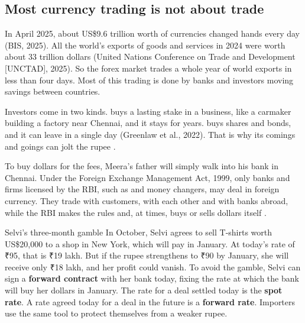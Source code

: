 \subsection{Most currency trading is not about trade}
In April 2025, about US\$9.6 trillion worth of currencies changed hands every day (BIS, 2025). All the world's exports of goods and services in 2024 were worth about 33 trillion dollars (United Nations Conference on Trade and Development [UNCTAD], 2025). So the forex market trades a whole year of world exports in less than four days. Most of this trading is done by banks and investors moving savings between countries.

Investors come in two kinds.  buys a lasting stake in a business, like a carmaker building a factory near Chennai, and it stays for years.  buys shares and bonds, and it can leave in a single day (Greenlaw et al., 2022). That is why its comings and goings can jolt the rupee .

To buy dollars for the fees, Meera's father will simply walk into his bank in Chennai. Under the Foreign Exchange Management Act, 1999, only banks and firms licensed by the RBI, such as  and money changers, may deal in foreign currency. They trade with customers, with each other and with banks abroad, while the RBI makes the rules and, at times, buys or sells dollars itself .

\begin{casestudy}{Selvi's three-month gamble}
In October, Selvi agrees to sell T-shirts worth US\$20,000 to a shop in New York, which will pay in January. At today's rate of ₹95, that is ₹19 lakh. But if the rupee strengthens to ₹90 by January, she will receive only ₹18 lakh, and her profit could vanish. To avoid the gamble, Selvi can sign a \textbf{forward contract} with her bank today, fixing the rate at which the bank will buy her dollars in January. The rate for a deal settled today is the \textbf{spot rate}. A rate agreed today for a deal in the future is a \textbf{forward rate}. Importers use the same tool to protect themselves from a weaker rupee.
\end{casestudy}

